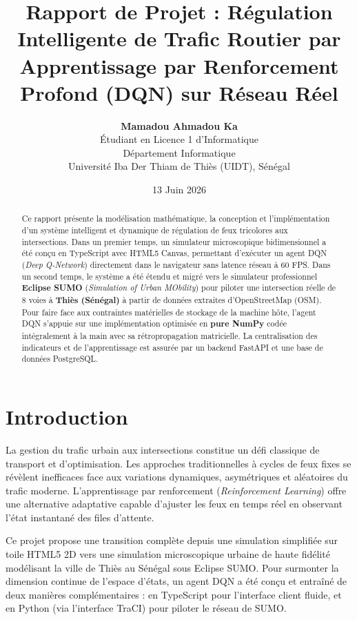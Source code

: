 \documentclass[11pt,a4paper]{article}
\title{\textbf{Rapport de Projet : Régulation Intelligente de Trafic Routier par Apprentissage par Renforcement Profond (DQN) sur Réseau Réel}}
\author{\textbf{Mamadou Ahmadou Ka} \\
Étudiant en Licence 1 d'Informatique \\
Département Informatique \\
Université Iba Der Thiam de Thiès (UIDT), Sénégal}
\date{13 Juin 2026}
\begin{document}
\maketitle

\begin{abstract}
Ce rapport présente la modélisation mathématique, la conception et l'implémentation d'un système intelligent et dynamique de régulation de feux tricolores aux intersections. Dans un premier temps, un simulateur microscopique bidimensionnel a été conçu en TypeScript avec HTML5 Canvas, permettant d'exécuter un agent DQN (\textit{Deep Q-Network}) directement dans le navigateur sans latence réseau à 60 FPS. Dans un second temps, le système a été étendu et migré vers le simulateur professionnel \textbf{Eclipse SUMO} (\textit{Simulation of Urban MObility}) pour piloter une intersection réelle de 8 voies à \textbf{Thiès (Sénégal)} à partir de données extraites d'OpenStreetMap (OSM). Pour faire face aux contraintes matérielles de stockage de la machine hôte, l'agent DQN s'appuie sur une implémentation optimisée en \textbf{pure NumPy} codée intégralement à la main avec sa rétropropagation matricielle. La centralisation des indicateurs et de l'apprentissage est assurée par un backend FastAPI et une base de données PostgreSQL.
\end{abstract}

\newpage
\tableofcontents
\newpage

\section{Introduction}
La gestion du trafic urbain aux intersections constitue un défi classique de transport et d'optimisation. Les approches traditionnelles à cycles de feux fixes se révèlent inefficaces face aux variations dynamiques, asymétriques et aléatoires du trafic moderne. L'apprentissage par renforcement (\textit{Reinforcement Learning}) offre une alternative adaptative capable d'ajuster les feux en temps réel en observant l'état instantané des files d'attente.

Ce projet propose une transition complète depuis une simulation simplifiée sur toile HTML5 2D vers une simulation microscopique urbaine de haute fidélité modélisant la ville de Thiès au Sénégal sous Eclipse SUMO. Pour surmonter la dimension continue de l'espace d'états, un agent DQN a été conçu et entraîné de deux manières complémentaires : en TypeScript pour l'interface client fluide, et en Python (via l'interface TraCI) pour piloter le réseau de SUMO.
\end{document}
